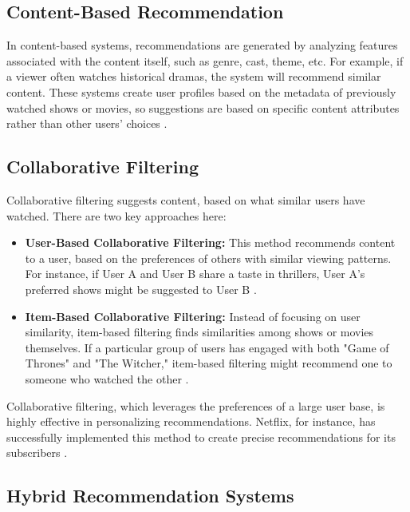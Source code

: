 \documentclass[12pt, english, a4paper]{article}
\begin{document}
\subsection{Content-Based Recommendation}

\hspace*{2em}In content-based systems, recommendations are generated by analyzing features associated with the content itself, such as genre, cast, theme, etc. For example, if a viewer often watches historical dramas, the system will recommend similar content. These systems create user profiles based on the metadata of previously watched shows or movies, so suggestions are based on specific content attributes rather than other users’ choices \cite{Lubos2023, Peng2024}.

\subsection{Collaborative Filtering}

\hspace*{2em}Collaborative filtering suggests content, based on what similar users have watched. There are two key approaches here:

\begin{itemize}
    \item \textbf{User-Based Collaborative Filtering:} This method recommends content to a user, based on the preferences of others with similar viewing patterns. For instance, if User A and User B share a taste in thrillers, User A’s preferred shows might be suggested to User B \cite{Lubos2023, Dang2021}.
    
    \item \textbf{Item-Based Collaborative Filtering:} Instead of focusing on user similarity, item-based filtering finds similarities among shows or movies themselves. If a particular group of users has engaged with both "Game of Thrones" and "The Witcher," item-based filtering might recommend one to someone who watched the other \cite{Lubos2023, Dang2021}.
\end{itemize}

Collaborative filtering, which leverages the preferences of a large user base, is highly effective in personalizing recommendations. Netflix, for instance, has successfully implemented this method to create precise recommendations for its subscribers \cite{Steck20217, Mu2023}.

\subsection{Hybrid Recommendation Systems}
\end{document}
